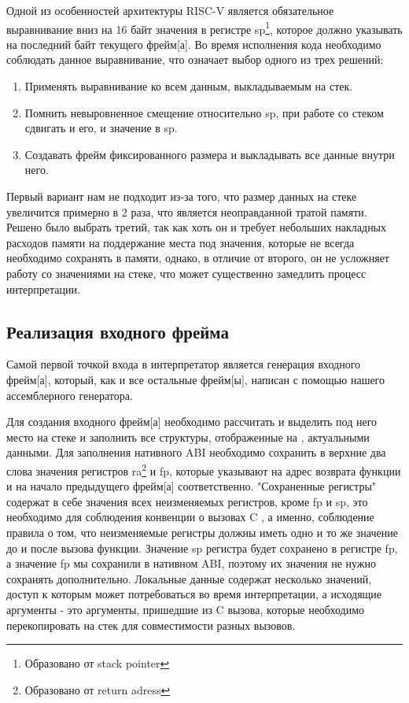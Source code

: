     Одной из особенностей архитектуры RISC-V является обязательное выравнивание вниз на 16 байт значения в регистре sp\footnote{Образовано от stack pointer}, которое должно указывать на последний байт текущего \gls{фрейм}[а]. Во время исполнения кода необходимо соблюдать данное выравнивание, что означает выбор одного из трех решений:
\begin{enumerate}
    \item Применять выравнивание ко всем данным, выкладываемым на стек.
    \item Помнить невыровненное смещение относительно sp, при работе со стеком сдвигать и его, и значение в sp.
    \item Создавать \gls{фрейм} фиксированного размера и выкладывать все данные внутри него.
\end{enumerate}

Первый вариант нам не подходит из-за того, что размер данных на стеке увеличится примерно в 2 раза, что является неоправданной тратой памяти. Решено было выбрать третий, так как хоть он и требует небольших накладных расходов памяти на поддержание места под значения, которые не всегда необходимо сохранять в памяти, однако, в отличие от второго, он не усложняет работу со значениями на стеке, что может существенно замедлить процесс интерпретации.

\subsection{Реализация входного фрейма}

Самой первой точкой входа в интерпретатор является генерация входного \gls{фрейм}[а], который, как и все остальные \gls{фрейм}[ы], написан с помощью нашего ассемблерного генератора. 

Для создания входного \gls{фрейм}[а] необходимо рассчитать и выделить под него место на стеке и заполнить все структуры, отображенные на , актуальными данными. Для заполнения нативного ABI необходимо сохранить в верхние два слова значения регистров ra\footnote{Образовано от return adress} и fp, которые указывают на адрес возврата функции и на начало предыдущего \gls{фрейм}[а] соответственно. "Сохраненные регистры" содержат в себе значения всех неизменяемых регистров, кроме fp и sp, это необходимо для соблюдения конвенции о вызовах C \cite{riscv:convention}, а именно, соблюдение правила о том, что неизменяемые регистры должны иметь одно и то же значение до и после вызова функции. Значение sp регистра будет сохранено в регистре fp, а значение fp мы сохранили в нативном ABI, поэтому их значения не нужно сохранять дополнительно. Локальные данные содержат несколько значений, доступ к которым может потребоваться во время интерпретации, а исходящие аргументы - это аргументы, пришедшие из C вызова, которые необходимо перекопировать на стек для совместимости разных вызовов.
 
